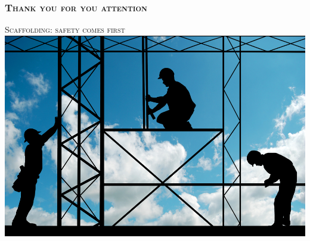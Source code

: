 \documentclass{beamer}
\begin{document}
\section*{}
\begin{frame}
\frametitle{\textsc{Thank you for you attention}}
\begin{center}
\textsc{Scaffolding: safety comes first} \\
\vspace*{0.5cm}
\includegraphics[scale=1]{joke.jpg}
\end{center}
\end{frame}
\end{document}
